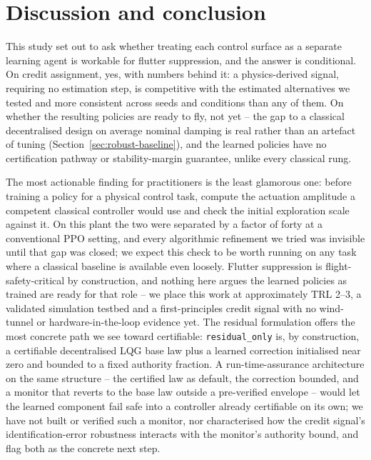 \documentclass[journal]{new-aiaa}
\begin{document}
\section{Discussion and conclusion}
\label{sec:discussion}

This study set out to ask whether treating each control surface as a
separate learning agent is workable for flutter suppression, and the
answer is conditional. On credit assignment, yes, with numbers behind it:
a physics-derived signal, requiring no estimation step, is competitive
with the estimated alternatives we tested and more consistent across seeds
and conditions than any of them. On whether the resulting policies are
ready to fly, not yet -- the gap to a classical decentralised design on
average nominal damping is real rather than an artefact of tuning
(Section~\ref{sec:robust-baseline}), and the learned policies have no
certification pathway or stability-margin guarantee, unlike every
classical rung.

The most actionable finding for practitioners is the least glamorous one:
before training a policy for a physical control task, compute the
actuation amplitude a competent classical controller would use and check
the initial exploration scale against it. On this plant the two were
separated by a factor of forty at a conventional PPO setting, and every
algorithmic refinement we tried was invisible until that gap was closed;
we expect this check to be worth running on any task where a classical
baseline is available even loosely. Flutter suppression is
flight-safety-critical by construction, and nothing here argues the
learned policies as trained are ready for that role -- we place this work
at approximately TRL 2--3, a validated simulation testbed and a
first-principles credit signal with no wind-tunnel or hardware-in-the-loop
evidence yet. The residual formulation offers the most concrete path we
see toward certifiable: \texttt{residual\_only} is, by construction, a
certifiable decentralised LQG base law plus a learned correction
initialised near zero and bounded to a fixed authority fraction. A
run-time-assurance architecture on the same structure -- the certified law
as default, the correction bounded, and a monitor that reverts to the base
law outside a pre-verified envelope -- would let the learned component
fail safe into a controller already certifiable on its own; we have not
built or verified such a monitor, nor characterised how the credit
signal's identification-error robustness interacts with the monitor's
authority bound, and flag both as the concrete next step.
\end{document}
